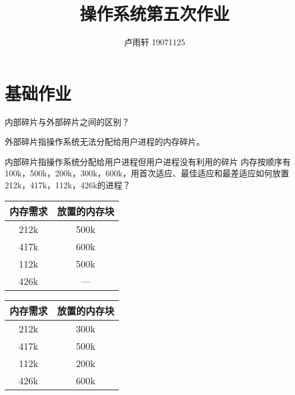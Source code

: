 \documentclass{ctexart}
\title{操作系统第五次作业}
\author{卢雨轩 19071125}
\begin{document}
\maketitle

\section*{基础作业}

\begin{outline}[enumerate]
    \1 内部碎片与外部碎片之间的区别？
        
        外部碎片指操作系统无法分配给用户进程的内存碎片。

        内部碎片指操作系统分配给用户进程但用户进程没有利用的碎片
    \1 内存按顺序有100k，500k，200k，300k，600k，用首次适应、最佳适应和最差适应如何放置212k，417k，112k，426k的进程？

        \begin{multicols}{3}
            \begin{center}
                \begin{tabular}{c c}
                    \toprule
                    内存需求 & 放置的内存块 \\
                    \midrule
                    212k & 500k \\
                    417k & 600k \\
                    112k & 500k \\
                    426k & --- \\
                    \bottomrule
                \end{tabular}
            \end{center}

            \begin{center}
                \begin{tabular}{c c}
                    \toprule
                    内存需求 & 放置的内存块 \\
                    \midrule
                    212k & 300k \\
                    417k & 500k \\
                    112k & 200k \\
                    426k & 600k \\
                    \bottomrule
                \end{tabular}
            \end{center}


\end{multicols}
\end{outline}
\end{document}
